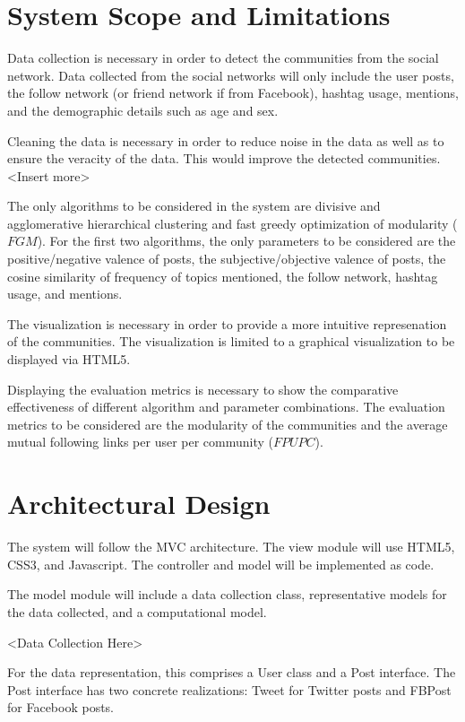 \section{System Scope and Limitations}
Data collection is necessary in order to detect the communities from the social network.
Data collected from the social networks will only include the user posts, the follow network (or friend network if from Facebook),
hashtag usage, mentions, and the demographic details such as age and sex.

Cleaning the data is necessary in order to reduce noise in the data as well as to ensure the veracity of the data. This 
would improve the detected communities. \textless Insert more\textgreater

The only algorithms to be considered in the system are divisive and agglomerative hierarchical clustering and fast greedy optimization
of modularity ($FGM$). For the first two algorithms, the only parameters to be considered are the positive/negative valence of posts, 
the subjective/objective valence of posts, the cosine similarity of frequency of topics mentioned, the follow network, hashtag usage,
and mentions.

The visualization is necessary in order to provide a more intuitive represenation of the communities. The visualization is limited to 
a graphical visualization to be displayed via HTML5.

Displaying the evaluation metrics is necessary to show the comparative effectiveness of different algorithm and parameter combinations.
The evaluation metrics to be considered are the modularity of the communities and the average mutual following links per user per community
($FPUPC$).


\section{Architectural Design}
The system will follow the MVC architecture. The view module will use HTML5, CSS3, and Javascript. The 
controller and model will be implemented as code.

The model module will include a data collection class, representative models for the data collected, and a computational model.

\textless Data Collection Here\textgreater

For the data representation, this comprises a User class and a Post interface.
The Post interface has two concrete realizations: Tweet for Twitter posts and FBPost for Facebook posts.

